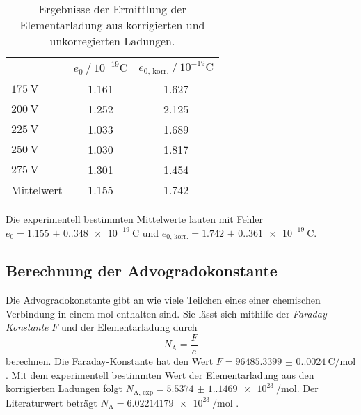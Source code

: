 \begin{table}
    \centering
    \caption{Ergebnisse der Ermittlung der Elementarladung aus korrigierten und unkorregierten Ladungen.}
    \label{tab:elementar}
    \begin{tabular}{l S[table-format = 1.3] S}
      \toprule
        {} & {$e_0 \mathbin{/} 10^{-19} \unit{\coulomb}$} & {$e_{0\text{, korr.}} \mathbin{/} 10^{-19} \unit{\coulomb}$} \\
        \midrule
        {$\qty{175}{\volt}$} & 1.161 & 1.627 \\
        {$\qty{200}{\volt}$} & 1.252 & 2.125 \\
        {$\qty{225}{\volt}$} & 1.033 & 1.689 \\
        {$\qty{250}{\volt}$} & 1.030 & 1.817 \\
        {$\qty{275}{\volt}$} & 1.301 & 1.454 \\
        {Mittelwert}         & 1.155 & 1.742 \\
      \bottomrule
    \end{tabular}
  \end{table}
Die experimentell bestimmten Mittelwerte lauten mit Fehler $e_0 = \qty{1.155(0.348)e-19}{\coulomb}$ und $e_{0 \text{, korr.}} = \qty{1.742(0.361)e-19}{\coulomb}$. 
\subsection{Berechnung der Advogradokonstante}
\label{subsec:Avogadro}
Die Advogradokonstante gibt an wie viele Teilchen eines einer chemischen Verbindung in einem $\unit{\mol}$ enthalten sind.
Sie lässt sich mithilfe der \textit{Faraday-Konstante} $F$ und der Elementarladung durch
\begin{equation*}
    \label{eqn:N_A}
    N_\text{A} = \frac{F}{e}
\end{equation*}
berechnen. Die Faraday-Konstante hat den Wert $F = \qty{96485.3399(0.0024)}{\coulomb\per\mol}$ \cite{Ingenieurwissen}.
Mit dem experimentell bestimmten Wert der Elementarladung aus den korrigierten Ladungen folgt $N_\text{A, exp} = \qty{5.5374(1.1469)e23}{\per\mol}$.
Der Literaturwert beträgt $N_\text{A} = \qty{6.02214179e23}{\per\mol}$ \cite{Ingenieurwissen}.
